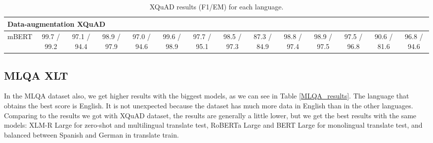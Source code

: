 \documentclass[11pt]{article}
\begin{document}
\begin{table*}[!ht]
\begin{adjustbox}{max width=\textwidth}
\begin{tabular}{l|cccccccccccc|c}
        \midrule
        \multicolumn{14}{l}{Data-augmentation XQuAD} \\
        \midrule
        mBERT & 99.7 / 99.2 & 97.1 / 94.4 & 98.9 / 97.9 & 97.0 / 94.6 & 99.6 / 98.9 & 97.7 / 95.1 & 98.5 / 97.3 & 87.3 / 84.9 & 98.8 / 97.4 & 98.9 / 97.5 & 97.5 / 96.8 & 90.6 / 81.6 & 96.8 / 94.6 \\
        \bottomrule
    \end{tabular}
    \end{adjustbox}
    \centering
    \caption{XQuAD results (F1/EM) for each language.}
    \label{XQuAD_results}
\end{table*}

\subsection{MLQA XLT}

In the MLQA dataset also, we get higher results with the biggest models, as we can see in Table \ref{MLQA_results}. The language that obtains the best score is English. It is not unexpected because the dataset has much more data in English than in the other languages.
Comparing to the results we got with XQuAD dataset, the results are generally a little lower, but we get the best results with the same models: XLM-R Large for zero-shot and multilingual translate test, RoBERTa Large and BERT Large for monolingual translate test, and balanced between Spanish and German in translate train.
\end{document}
